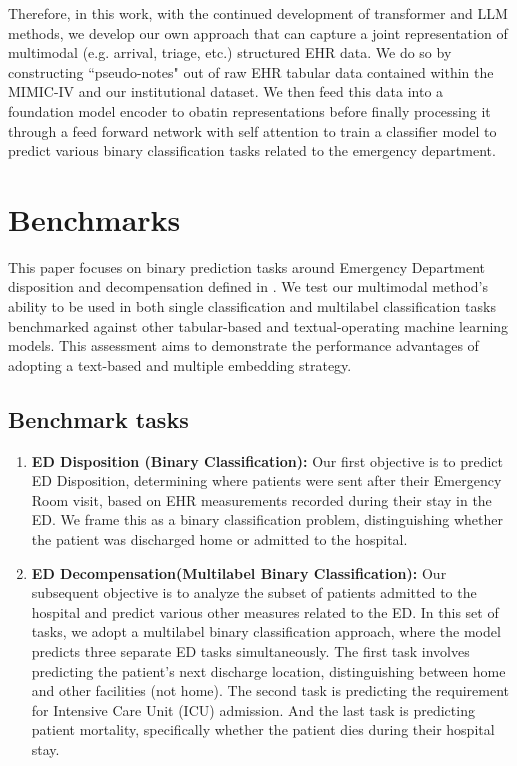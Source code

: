 \documentclass{article}
\theoremstyle{plain}
\theoremstyle{definition}
\theoremstyle{remark}
\begin{document}
Therefore, in this work, with the continued development of transformer and LLM methods, we develop our own approach that can capture a joint representation of multimodal (e.g. arrival, triage, etc.) structured EHR data. We do so by constructing ``pseudo-notes" out of raw EHR tabular data contained within the MIMIC-IV and our institutional dataset. We then feed this data into a foundation model encoder to obatin representations before finally processing it through a feed forward network with self attention to train a classifier model to predict various binary classification tasks related to the emergency department. 


\section{Benchmarks}
\label{data}

This paper focuses on binary prediction tasks around Emergency Department disposition and decompensation defined in \citep{chen2023multimodal}. We test our multimodal method's ability to be used in both single classification and multilabel classification tasks benchmarked against other tabular-based and textual-operating machine learning models. This assessment aims to demonstrate the performance advantages of adopting a text-based and multiple embedding strategy.
\subsection{Benchmark tasks}


\begin{enumerate}
        \item \textbf{ED Disposition (Binary Classification):} Our first objective is to predict ED Disposition, determining where patients were sent after their Emergency Room visit, based on EHR measurements recorded during their stay in the ED. We frame this as a binary classification problem, distinguishing whether the patient was discharged home or admitted to the hospital.
        
        \item \textbf{ED Decompensation(Multilabel Binary Classification):} Our subsequent objective is to analyze the subset of patients admitted to the hospital and predict various other measures related to the ED. In this set of tasks, we adopt a multilabel binary classification approach, where the model predicts three separate ED tasks simultaneously. The first task involves predicting the patient's next discharge location, distinguishing between home and other facilities (not home). The second task is predicting the requirement for Intensive Care Unit (ICU) admission.
        And the last task
        is predicting patient mortality, specifically whether the patient dies during their 
        hospital stay.  
\end{enumerate}
\end{document}

